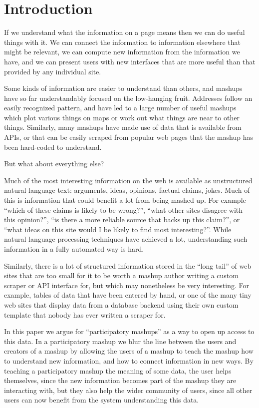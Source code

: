 \documentclass{chi2009}
\begin{document}
\section{Introduction}

If we understand what the information on a page means then we can do useful things with it. We can connect the information to information elsewhere that might be relevant, we can compute new information from the information we have, and we can present users with new interfaces that are more useful than that provided by any individual site. 

Some kinds of information are easier to understand than others, and mashups have so far understandably focused on the low-hanging fruit. Addresses follow an easily recognized pattern, and have led to a large number of useful mashups which plot various things on maps or work out what things are near to other things. Similarly, many mashups have made use of data that is available from APIs, or that can be easily scraped from popular web pages that the mashup has been hard-coded to understand.

But what about everything else? 

Much of the most interesting information on the web is available as unstructured natural language text: arguments, ideas, opinions, factual claims, jokes. Much of this is information that could benefit a lot from being mashed up. For example ``which of these claims is likely to be wrong?'', ``what other sites disagree with this opinion?'', ``is there a more reliable source that backs up this claim?'', or ``what ideas on this site would I be likely to find most interesting?''. While natural language processing techniques have achieved a lot, understanding such information in a fully automated way is hard.

Similarly, there is a lot of structured information stored in the ``long tail'' of web sites that are too small for it to be worth a mashup author writing a custom scraper or API interface for, but which may nonetheless be very interesting. For example, tables of data that have been entered by hand, or one of the many tiny web sites that display data from a database backend using their own custom template that nobody has ever written a scraper for.

In this paper we argue for ``participatory mashups'' as a way to open up access to this data. In a participatory mashup we blur the line between the users and creators of a mashup by allowing the users of a mashup to teach the mashup how to understand new information, and how to connect information in new ways. By teaching a participatory mashup the meaning of some data, the user helps themselves, since the new information becomes part of the mashup they are interacting with, but they also help the wider community of users, since all other users can now benefit from the system understanding this data.
\end{document}

